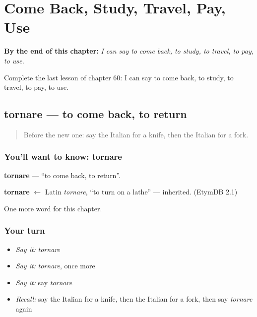 
\chapter{Come Back, Study, Travel, Pay, Use}
\label{ch:it-come-back-study-travel-pay-use}

\begin{chapteropening}
\textbf{By the end of this chapter:} \emph{I can say to come back, to study, to travel, to pay, to use.}

Complete the last lesson of chapter 60: I can say to come back, to study, to travel, to pay, to use.
\end{chapteropening}

\section[tornare]{tornare — to come back, to return}

\label{lesson:IT-C60-tornare}



\begin{quote}
Before the new one: say the Italian for a knife, then the Italian for a fork.
\end{quote}

\subsection*{You'll want to know: tornare}
\textbf{tornare} — \textquotedblleft{}to come back, to return\textquotedblright{}.

\begin{cousinweb}
\textbf{tornare} $\leftarrow$ Latin \emph{tornare}, \textquotedblleft{}to turn on a lathe\textquotedblright{} — inherited. (EtymDB 2.1)
\end{cousinweb}

\begin{grammarlens}[title={What you've built}]
One more word for this chapter.
\end{grammarlens}

\subsection*{Your turn}
\begin{itemize}
\raggedright
  \item \emph{Say it:} \emph{tornare}
  \item \emph{Say it:} \emph{tornare}, once more
  \item \emph{Say it:} say \emph{tornare}
  \item \emph{Recall:} say the Italian for a knife, then the Italian for a fork, then say \emph{tornare} again
\end{itemize}

